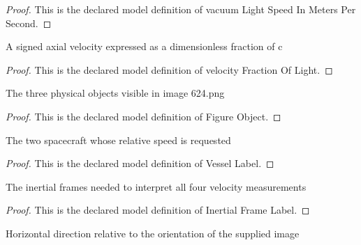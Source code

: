\begin{proof}
  This is the declared model definition of vacuum Light Speed In Meters Per Second.
\end{proof}
\begin{definition}
  \label{def:physics:phyx-mini-0624:phyxminiproblems-problemphyxmini0624-velocityfractionoflight}
  A signed axial velocity expressed as a dimensionless fraction of c
\end{definition}
\begin{proof}
  This is the declared model definition of velocity Fraction Of Light.
\end{proof}
\begin{definition}
  \label{def:physics:phyx-mini-0624:phyxminiproblems-problemphyxmini0624-figureobject}
  The three physical objects visible in image 624.png
\end{definition}
\begin{proof}
  This is the declared model definition of Figure Object.
\end{proof}
\begin{definition}
  \label{def:physics:phyx-mini-0624:phyxminiproblems-problemphyxmini0624-vessellabel}
  The two spacecraft whose relative speed is requested
\end{definition}
\begin{proof}
  This is the declared model definition of Vessel Label.
\end{proof}
\begin{definition}
  \label{def:physics:phyx-mini-0624:phyxminiproblems-problemphyxmini0624-inertialframelabel}
  The inertial frames needed to interpret all four velocity measurements
\end{definition}
\begin{proof}
  This is the declared model definition of Inertial Frame Label.
\end{proof}
\begin{definition}
  \label{def:physics:phyx-mini-0624:phyxminiproblems-problemphyxmini0624-horizontaldirection}
  Horizontal direction relative to the orientation of the supplied image
\end{definition}
